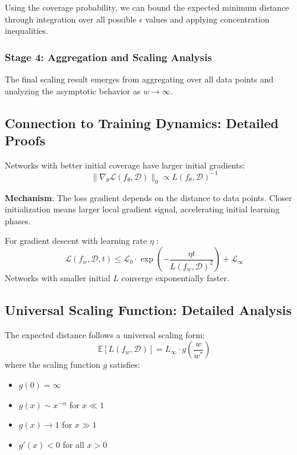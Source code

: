 Using the coverage probability, we can bound the expected minimum distance through integration over all possible $\epsilon$ values and applying concentration inequalities.

\subsubsection{Stage 4: Aggregation and Scaling Analysis}

The final scaling result emerges from aggregating over all data points and analyzing the asymptotic behavior as $w \to \infty$.

\subsection{Connection to Training Dynamics: Detailed Proofs}
\label{subsec:training-dynamics-proofs}

\begin{theorem}
Networks with better initial coverage have larger initial gradients:
$$\|\nabla_\theta \mathcal{L}(f_\theta, \mathcal{D})\|_0 \propto L(f_\theta, \mathcal{D})^{-1}$$
\end{theorem}

\textbf{Mechanism}: The loss gradient depends on the distance to data points. Closer initialization means larger local gradient signal, accelerating initial learning phases.

\begin{theorem}
For gradient descent with learning rate $\eta$ \cite{Nocedal2018NumericalO}:
$$\mathcal{L}(f_w, \mathcal{D}, t) \leq \mathcal{L}_0 \cdot \exp\left(-\frac{\eta t}{L(f_w, \mathcal{D})^2}\right) + \mathcal{L}_\infty$$
Networks with smaller initial $L$ converge exponentially faster.
\end{theorem}

\subsection{Universal Scaling Function: Detailed Analysis}
\label{subsec:universal-scaling-detailed}

\begin{theorem}
The expected distance follows a universal scaling form:
$$\mathbb{E}[L(f_w, \mathcal{D})] = L_\infty \cdot g\left(\frac{w}{w^*}\right)$$
where the scaling function $g$ satisfies:
\begin{itemize}
    \item $g(0) = \infty$
    \item $g(x) \sim x^{-\alpha}$ for $x \ll 1$
    \item $g(x) \to 1$ for $x \gg 1$
    \item $g'(x) < 0$ for all $x > 0$
\end{itemize}
\end{theorem}

